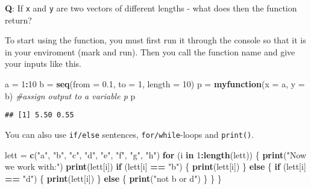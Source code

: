 \documentclass[]{article}
\newenvironment{Shaded}{\begin{snugshade}}{\end{snugshade}}
\newcommand{\KeywordTok}[1]{\textcolor[rgb]{0.13,0.29,0.53}{\textbf{#1}}}
\newcommand{\DataTypeTok}[1]{\textcolor[rgb]{0.13,0.29,0.53}{#1}}
\newcommand{\DecValTok}[1]{\textcolor[rgb]{0.00,0.00,0.81}{#1}}
\newcommand{\FloatTok}[1]{\textcolor[rgb]{0.00,0.00,0.81}{#1}}
\newcommand{\StringTok}[1]{\textcolor[rgb]{0.31,0.60,0.02}{#1}}
\newcommand{\CommentTok}[1]{\textcolor[rgb]{0.56,0.35,0.01}{\textit{#1}}}
\newcommand{\ControlFlowTok}[1]{\textcolor[rgb]{0.13,0.29,0.53}{\textbf{#1}}}
\newcommand{\OperatorTok}[1]{\textcolor[rgb]{0.81,0.36,0.00}{\textbf{#1}}}
\newcommand{\NormalTok}[1]{#1}
\begin{document}
\textbf{Q}: If \texttt{x} and \texttt{y} are two vectors of different
lengths - what does then the function return?

To start using the function, you must first run it through the console
so that it is in your enviroment (mark and run). Then you call the
function name and give your inputs like this.

\begin{Shaded}
\begin{Highlighting}[]
\NormalTok{a =}\StringTok{ }\DecValTok{1}\OperatorTok{:}\DecValTok{10}
\NormalTok{b =}\StringTok{ }\KeywordTok{seq}\NormalTok{(}\DataTypeTok{from =} \FloatTok{0.1}\NormalTok{, }\DataTypeTok{to =} \DecValTok{1}\NormalTok{, }\DataTypeTok{length =} \DecValTok{10}\NormalTok{)}
\NormalTok{p =}\StringTok{ }\KeywordTok{myfunction}\NormalTok{(}\DataTypeTok{x =}\NormalTok{ a, }\DataTypeTok{y =}\NormalTok{ b)  }\CommentTok{#assign output to a variable p}
\NormalTok{p}
\end{Highlighting}
\end{Shaded}

\begin{verbatim}
## [1] 5.50 0.55
\end{verbatim}

You can also use \texttt{if/else} sentences, \texttt{for/while}-loops
and \texttt{print()}.

\begin{Shaded}
\begin{Highlighting}[]
\NormalTok{lett =}\StringTok{ }\KeywordTok{c}\NormalTok{(}\StringTok{"a"}\NormalTok{, }\StringTok{"b"}\NormalTok{, }\StringTok{"c"}\NormalTok{, }\StringTok{"d"}\NormalTok{, }\StringTok{"e"}\NormalTok{, }\StringTok{"f"}\NormalTok{, }\StringTok{"g"}\NormalTok{, }\StringTok{"h"}\NormalTok{)}
\ControlFlowTok{for}\NormalTok{ (i }\ControlFlowTok{in} \DecValTok{1}\OperatorTok{:}\KeywordTok{length}\NormalTok{(lett)) \{}
    \KeywordTok{print}\NormalTok{(}\StringTok{"Now we work with:"}\NormalTok{)}
    \KeywordTok{print}\NormalTok{(lett[i])}
    \ControlFlowTok{if}\NormalTok{ (lett[i] }\OperatorTok{==}\StringTok{ "b"}\NormalTok{) \{}
        \KeywordTok{print}\NormalTok{(lett[i])}
\NormalTok{    \} }\ControlFlowTok{else}\NormalTok{ \{}
        \ControlFlowTok{if}\NormalTok{ (lett[i] }\OperatorTok{==}\StringTok{ "d"}\NormalTok{) \{}
            \KeywordTok{print}\NormalTok{(lett[i])}
\NormalTok{        \} }\ControlFlowTok{else}\NormalTok{ \{}
            \KeywordTok{print}\NormalTok{(}\StringTok{"not b or d"}\NormalTok{)}
\NormalTok{        \}}
\NormalTok{    \}}
\NormalTok{\}}
\end{Highlighting}
\end{Shaded}
\end{document}

